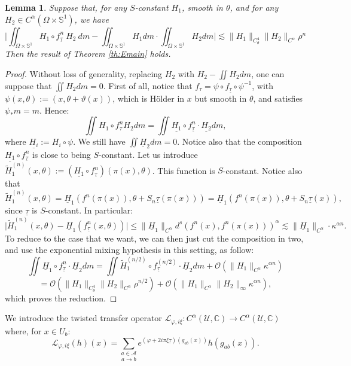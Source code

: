 \documentclass[a4paper]{article}
\newtheorem{lemma}[theorem]{Lemma}
\theoremstyle{definition}
\begin{document}
\begin{lemma}\label{lem:Ereduc1}
Suppose that, for any $S$-constant $H_1$, smooth in $\theta$, and for any $H_2 \in C^\alpha(\Omega \times \mathbb{S}^1)$, we have
$$ \Big| \iint_{\Omega \times \mathbb{S}^1} H_1 \circ f_{\underline{\tau}}^n \ H_2 \ dm - \iint_{\Omega \times \mathbb{S}^1} H_1 dm \cdot \iint_{\Omega \times \mathbb{S}^1} H_2 dm \Big| \lesssim \|H_1\|_{C^4_\theta} \|H_2\|_{C^\alpha} \rho^n $$
Then the result of Theorem \ref{th:Emain} holds.
\end{lemma}

\begin{proof}
Without loss of generality, replacing $H_2$ with $H_2-\iint H_2 dm$, one can suppose that $\iint H_2 dm = 0$. First of all, notice that $f_\tau = \psi \circ f_{\underline{\tau}} \circ \psi^{-1}$, with $\psi(x,\theta) := (x,\theta+\vartheta(x))$, which is Hölder in $x$ but smooth in $\theta$, and satisfies $\psi_* m = m$. Hence:
$$ \iint H_1 \circ f_\tau^n H_2 dm =  \iint \underline{H_1} \circ f_{\underline{\tau}}^n \cdot \underline{H_2} dm ,$$
where $\underline{H_i} := H_i \circ \psi$. We still have $\iint \underline{H}_2 dm=0$. Notice also that the composition $\underline{H_1} \circ f_{\underline{\tau}}^n$ is close to being $S$-constant. Let us introduce $\widetilde{H}_{1}^{(n)}(x,\theta) := (\underline{H_1} \circ f_{\underline{\tau}}^{n})(\pi(x),\theta)$. This function is $S$-constant. Notice also that $$ \tilde{H}_1^{(n)}(x,\theta) = \underline{H}_1( f^{n}(\pi(x)), \theta+S_{n} \underline{\tau}(\pi(x)) ) = \underline{H}_1( f^{n}(\pi(x)), \theta+S_{n} \underline{\tau}(x)), $$
since $\underline{\tau}$ is $S$-constant. In particular: $$\Big|\tilde{H}_1^{(n)}(x,\theta) - \underline{H}_1(f^n_{\underline{\tau}}(x,\theta))\Big| \leq \|\underline{H}_1\|_{C^\alpha} d^s(f^n(x),f^n(\pi(x)))^\alpha \lesssim \|\underline{H}_1\|_{C^\alpha} \cdot \kappa^{\alpha n} .$$
To reduce to the case that we want, we can then just cut the composition in two, and use the exponential mixing hypothesis in this setting, as follow:
$$ \iint \underline{H}_1 \circ f_{\underline{\tau}}^n \cdot \underline{H}_2 dm   =  \iint \tilde{H}_1^{(n/2)} \circ f_{\underline{\tau}}^{(n/2)}  \cdot \underline{H}_2 dm  + \mathcal{O}(\|H_1\|_{C^\alpha} \kappa^{\alpha n} )  $$
$$  = \mathcal{O}(\|H_1\|_{C^4_\theta} \|H_2\|_{C^\alpha} \rho^{n/2}) + \mathcal{O}(\|H_1\|_{C^\alpha} \|H_2\|_{\infty} \kappa^{\alpha n} ) ,$$ 
which proves the reduction.
\end{proof}


We introduce the twisted transfer operator $\mathcal{L}_{\varphi,i \xi} : C^{\alpha}(\mathcal{U},\mathbb{C}) \rightarrow C^{\alpha}(\mathcal{U},\mathbb{C}) $
where, for $x \in U_b$: $$ \mathcal{L}_{\varphi,i\xi}(h)(x) = \underset{a \rightarrow b}{\sum_{a \in \mathcal{A}}} e^{(\varphi+2i \pi\xi \underline{\tau})(g_{ab}(x))} h(g_{ab}(x)) .$$
\end{document}

